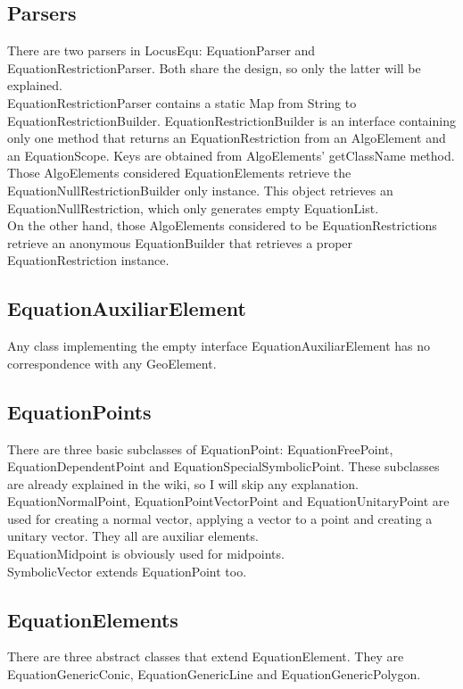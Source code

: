 \documentclass[12pt, oneside, a4paper]{article}
\begin{document}
\subsection{Parsers}
\label{ss:Parsers}

There are two parsers in LocusEqu: EquationParser and
EquationRestrictionParser. Both share the design, so only the latter
will be explained.\\

EquationRestrictionParser contains a static Map from String to
EquationRestrictionBuilder. EquationRestrictionBuilder is an interface
containing only one method that returns an EquationRestriction from an
AlgoElement and an EquationScope. Keys are obtained from AlgoElements'
getClassName method.\\

Those AlgoElements considered EquationElements retrieve the
EquationNullRestrictionBuilder only instance. This object retrieves an
EquationNullRestriction, which only generates empty EquationList.\\

On the other hand, those AlgoElements considered to be
EquationRestrictions retrieve an anonymous EquationBuilder that
retrieves a proper EquationRestriction instance.

\subsection{EquationAuxiliarElement}

Any class implementing the empty interface EquationAuxiliarElement has
no correspondence with any GeoElement.\\

\subsection{EquationPoints}

There are three basic subclasses of EquationPoint: EquationFreePoint,
EquationDependentPoint and EquationSpecialSymbolicPoint. These
subclasses are already explained in the wiki, so I will skip any
explanation.\\

EquationNormalPoint, EquationPointVectorPoint and EquationUnitaryPoint
are used for creating a normal vector, applying a vector to a point
and creating a unitary vector. They all are auxiliar elements.\\

EquationMidpoint is obviously used for midpoints.\\

SymbolicVector extends EquationPoint too.

\subsection{EquationElements}

There are three abstract classes that extend EquationElement. They are
EquationGenericConic, EquationGenericLine and EquationGenericPolygon.
\end{document}
